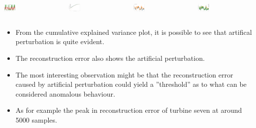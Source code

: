 \documentclass[18pt, a3paper, portrait]{tikzposter}
\begin{document}
\begin{columns}
    {
        \begin{tikzfigure}
            \includegraphics[width=0.21\textwidth]{images/perturbed_vs_unperturbed.png}
        \end{tikzfigure}
    }

    {
        \begin{tikzfigure}
            \includegraphics[width=0.21\textwidth]{images/explained_variance_perturbed.png}
        \end{tikzfigure}
    }

    {
        \begin{tikzfigure}
            \includegraphics[width=0.21\textwidth]{images/pert_vs_unpert_reconstruction_error.png}
        \end{tikzfigure}
    }

    {
        \begin{tikzfigure}
            \includegraphics[width=0.21\textwidth]{images/reconstruction_error_perturbed.png}
        \end{tikzfigure}
    }
\end{columns}

{
    \begin{itemize}
        \item From the cumulative explained variance plot, it is possible to see that artifical perturbation is quite evident.
        \item The reconstruction error also shows the artificial perturbation.
        \item The most interesting observation might be that the reconstruction error caused by artificial perturbation could yield a ''threshold'' as to what can be considered anomalous behaviour.
        \item As for example the peak in reconstruction error of turbine seven at around 5000 samples.
    \end{itemize}
}
\end{document}
